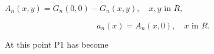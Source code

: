 $A_n(x,y) = G_n(0,0) - G_n(x,y), \quad x,y \text{ in } R,$

$$a_n(x) = A_n(x,0), \quad x \text{ in } R.$$

At this point P1 has become